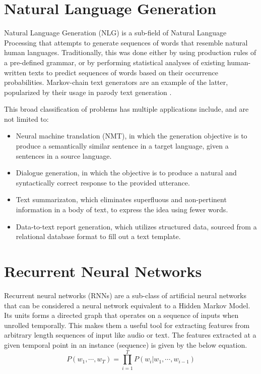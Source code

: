 \section{Natural Language Generation}

Natural Language Generation (NLG) is a sub-field of Natural Language Processing that attempts to generate sequences of words that resemble natural human languages. Traditionally, this was done either by using production rules of a pre-defined grammar, or by performing statistical analyses of existing human-written texts to predict sequences of words based on their occurrence probabilities. Markov-chain text generators are an example of the latter, popularized by their usage in parody text generation \cite{jelinek1985markov}.

This broad classification of problems has multiple applications include, and are not limited to:
\begin{itemize}
	\item Neural machine translation (NMT), in which the generation objective is to produce a semantically similar sentence in a target language, given a sentences in a source language.
	\item Dialogue generation, in which the objective is to produce a natural and syntactically correct response to the provided utterance.
	\item Text summarizaton, which eliminates superfluous and non-pertinent information in a body of text, to express the idea using fewer words.
	\item Data-to-text report generation, which utilizes structured data, sourced from a relational database format to fill out a text template.
\end{itemize}

\section{Recurrent Neural Networks}

Recurrent neural networks (RNNs) are a sub-class of artificial neural networks that can be considered a neural network equivalent to a Hidden Markov Model. Its units forms a directed graph that operates on a sequence of inputs when unrolled temporally. This makes them a useful tool for extracting features from arbitrary length sequences of input like audio or text. The features extracted at a given temporal point in an instance (sequence) is given by the below equation.
\begin{equation}
	P(w_1, \cdots, w_T) = \prod_{i=1}^T P(w_i | w_1, \cdots, w_{i−1})
\end{equation}

